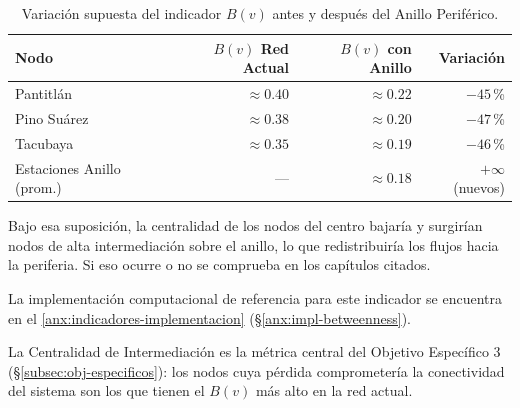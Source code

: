 \begin{table}[H]
    \centering
    \caption{Variación supuesta del indicador $B(v)$ antes y después del Anillo
    Periférico.}
    \label{tab:betweenness}
    \begin{tabularx}{\textwidth}{X r r r}
        \toprule
        \textbf{Nodo} & \textbf{$B(v)$ Red Actual} &
        \textbf{$B(v)$ con Anillo} & \textbf{Variación} \\
        \midrule
        Pantitlán               & $\approx 0.40$ & $\approx 0.22$ & $-45$\,\% \\
        Pino Suárez             & $\approx 0.38$ & $\approx 0.20$ & $-47$\,\% \\
        Tacubaya                & $\approx 0.35$ & $\approx 0.19$ & $-46$\,\% \\
        Estaciones Anillo (prom.) & ---          & $\approx 0.18$ & $+\infty$ (nuevos) \\
        \bottomrule
    \end{tabularx}
\end{table}

Bajo esa suposición, la centralidad de los nodos del centro bajaría y surgirían
nodos de alta intermediación sobre el anillo, lo que redistribuiría los flujos
hacia la periferia. Si eso ocurre o no se comprueba en los capítulos citados.

La implementación computacional de referencia para este indicador se encuentra
en el \autoref{anx:indicadores-implementacion} (§\ref{anx:impl-betweenness}).

La Centralidad de Intermediación es la métrica central del Objetivo Específico 3
(§\ref{subsec:obj-especificos}): los nodos cuya pérdida comprometería la
conectividad del sistema son los que tienen el $B(v)$ más alto en la red actual.
